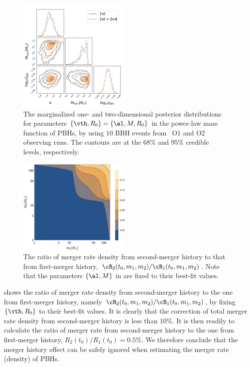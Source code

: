 \documentclass[
reprint,           %
superscriptaddress,%
amsmath,           %
amssymb,           %
aps,               %
prd,               %
notitlepage,       %
longbibliography,  %
floatfix,          %
showkeys,          %
]{revtex4-1}
\begin{document}
\begin{figure}[htbp!]
	\centering
	\includegraphics[width=0.5\textwidth]{post-power.pdf}
	\caption{\label{posterior-power}
		The marginalized one- and two-dimensional posterior distributions for 
    parameters $\{\vth, R_0\} = \{\al, M, R_0\}$ in the power-law mass function 
    of PBHs, by using $10$ BBH events from \lvc\ O1 and O2 observing runs.
    The contours are at the $68\%$ and $95\%$ credible levels, respectively. 
	}
\end{figure}

\begin{figure}[htbp!]
	\centering
	\includegraphics[width=0.5\textwidth]{ratio-power.pdf}
	\caption{\label{ratio-power}
		The ratio of merger rate density from second-merger history
        to that from first-merger history,
        $\cR_2(t_0, m_1, m_2)/\cR_1(t_0, m_1, m_2)$. Note that the parameters $\{\al, M\}$ in  are fixed to their best-fit values.
	}
\end{figure}

 shows the ratio of merger rate density from second-merger history
to the one from first-merger history, namely 
$\cR_2(t_0, m_1, m_2)/\cR_1(t_0, m_1, m_2)$, by fixing $\{\vth, R_0\}$ to their best-fit values.
It is clearly that the correction of total merger rate density from 
second-merger history is less than $10\%$.
It is then readily to calculate the ratio of merger rate from 
second-merger history to the one from first-merger history, 
$R_2(t_0)/R_1(t_0) = 0.5\%$.
We therefore conclude that the merger history effect can be safely ignored
when estimating the merger rate (density) of PBHs.
\end{document}
